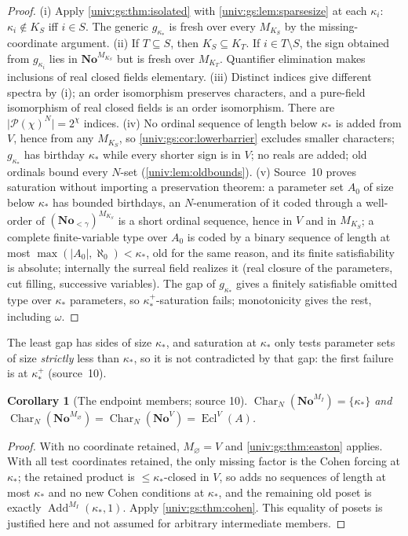 \documentclass[11pt,letterpaper]{article}
\numberwithin{equation}{section}
\newtheorem{corollary}[corollary]{Corollary}
\theoremstyle{definition}
\theoremstyle{remark}
\newcommand{\No}{\mathbf{No}}
\newcommand{\Pow}{\mathcal P}
\newcommand{\Add}{\operatorname{Add}}
\newcommand{\abs}[1]{\lvert#1\rvert}
\newcommand{\Char}{\operatorname{Char}}
\newcommand{\Ecl}{\operatorname{Ecl}}
\begin{document}
\begin{proof}
(i) Apply \cref{univ:gs:thm:isolated} with \cref{univ:gs:lem:sparsesize} at each $\kappa_i$:
$\kappa_i\notin K_S$ iff $i\in S$. The generic $g_{\kappa_*}$ is fresh over every
$M_{K_S}$ by the missing-coordinate argument. (ii) If $T\subseteq S$, then
$K_S\subseteq K_T$. If $i\in T\setminus S$, the sign obtained from $g_{\kappa_i}$ lies in
$\No^{M_{K_S}}$ but is fresh over $M_{K_T}$. Quantifier elimination makes inclusions of real
closed fields elementary. (iii) Distinct indices give different spectra by (i); an order
isomorphism preserves characters, and a pure-field isomorphism of real closed fields is an
order isomorphism. There are $\abs{\Pow(\chi)^N}=2^\chi$ indices. (iv) No ordinal sequence
of length below $\kappa_*$ is added from $V$, hence from any $M_{K_S}$, so
\cref{univ:gs:cor:lowerbarrier} excludes smaller characters; $g_{\kappa_*}$ has birthday
$\kappa_*$ while every shorter sign is in $V$; no reals are added; old ordinals bound every
$N$-set (\cref{univ:lem:oldbounds}). (v) Source~10 proves saturation without importing a
preservation theorem: a parameter set $A_0$ of size below $\kappa_*$ has bounded birthdays,
an $N$-enumeration of it coded through a well-order of $(\No_{<\gamma})^{M_{K_S}}$ is a short
ordinal sequence, hence in $V$ and in $M_{K_S}$; a complete finite-variable type over
$A_0$ is coded by a binary sequence of length at most $\max(\abs{A_0},\aleph_0)<\kappa_*$,
old for the same reason, and its finite satisfiability is absolute; internally the
surreal field realizes it (real closure of the parameters, cut filling, successive
variables). The gap of $g_{\kappa_*}$ gives a finitely satisfiable omitted type over
$\kappa_*$ parameters, so $\kappa_*^+$-saturation fails; monotonicity gives the rest,
including $\omega$.
\end{proof}

The least gap has sides of size $\kappa_*$, and saturation at $\kappa_*$ only tests
parameter sets of size \emph{strictly} less than $\kappa_*$, so it is not contradicted by
that gap: the first failure is at $\kappa_*^+$ (source~10).

\begin{corollary}[The endpoint members; source 10]\label{univ:gs:cor:endpoints}
$\Char_N(\No^{M_I})=\{\kappa_*\}$ and $\Char_N(\No^{M_\varnothing})=\Char_N(\No^V)=\Ecl^V(A)$.
\end{corollary}
\begin{proof}
With no coordinate retained, $M_\varnothing=V$ and \cref{univ:gs:thm:easton} applies. With
all test coordinates retained, the only missing factor is the Cohen forcing at $\kappa_*$;
the retained product is $\le\kappa_*$-closed in $V$, so adds no sequences of length at most
$\kappa_*$ and no new Cohen conditions at $\kappa_*$, and the remaining old poset is
exactly $\Add^{M_I}(\kappa_*,1)$. Apply \cref{univ:gs:thm:cohen}. This equality of posets
is justified here and not assumed for arbitrary intermediate members.
\end{proof}
\end{document}
